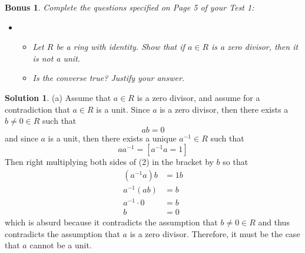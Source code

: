 \documentclass[11pt]{amsart}
\theoremstyle{}\newtheorem{question}{Question}
\theoremstyle{}\newtheorem*{bonus}{Bonus}
\theoremstyle{definition}\newtheorem*{solution}{Solution}
\begin{document}
\begin{bonus}
    Complete the questions specified on Page 5 of your Test 1:
    \begin{itemize}
        \item[(2)]
        \begin{itemize}
            \item[(a)] Let $R$ be a ring with identity. Show that if $a \in R$ is a zero divisor, then it is not a unit.
            \item[(b)] Is the converse true? Justify your answer.
        \end{itemize}
    \end{itemize}
\end{bonus}

\begin{solution}
    (a) Assume that $a \in R$ is a zero divisor, and assume for a contradiction that $a \in R$ is a unit. Since $a$ is a zero divisor, then there exists a $b \neq 0 \in R$ such that
    \begin{equation*}
        ab = 0 \tag{1}
    \end{equation*}
    and since $a$ is a unit, then there exists a unique $a^{-1} \in R$ such that
    \begin{equation*}
        aa^{-1} = [a^{-1} a = 1] \tag{2}
    \end{equation*}
    Then right multiplying both sides of (2) in the bracket by $b$ so that
    \begin{align*}
        (a^{-1}a)b &= 1b \\
        a^{-1}(ab) &= b \\
        a^{-1} \cdot 0 &= b \\
        b &= 0
    \end{align*}
    which is absurd because it contradicts the assumption that $b \neq 0 \in R$ and thus contradicts the assumption that $a$ is a zero divisor. Therefore, it must be the case that $a$ cannot be a unit.


\end{solution}
\end{document}
